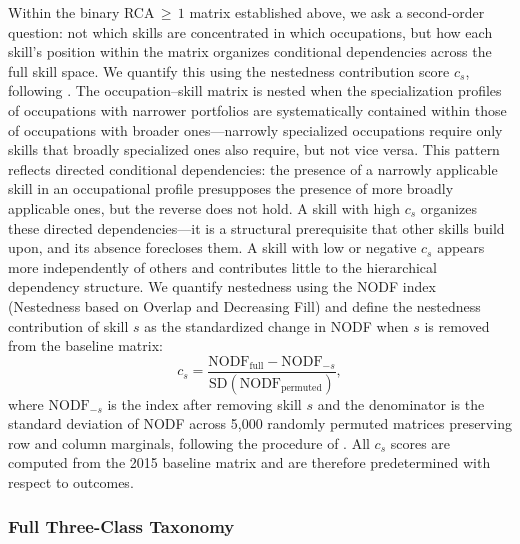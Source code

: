 \documentclass[11pt, letterpaper]{article} %
\newcommand{\parencite}[1]{\cite{#1}}
\newcommand{\textcite}[1]{\cite{#1}}
\begin{document}
Within the binary RCA$\,{\geq}\,1$ matrix established above, we ask a second-order question: not which skills are concentrated in which occupations, but how each skill's position within the matrix organizes conditional dependencies across the full skill space. We quantify this using the nestedness contribution score $c_s$, following \textcite{hosseinioun_skill_2025}. The occupation--skill matrix is nested when the specialization profiles of occupations with narrower portfolios are systematically contained within those of occupations with broader ones---narrowly specialized occupations require only skills that broadly specialized ones also require, but not vice versa. This pattern reflects directed conditional dependencies: the presence of a narrowly applicable skill in an occupational profile presupposes the presence of more broadly applicable ones, but the reverse does not hold. A skill with high $c_s$ organizes these directed dependencies---it is a structural prerequisite that other skills build upon, and its absence forecloses them. A skill with low or negative $c_s$ appears more independently of others and contributes little to the hierarchical dependency structure. We quantify nestedness using the NODF index (Nestedness based on Overlap and Decreasing Fill) \parencite{almeida_neto_consistent_2008} and define the nestedness contribution of skill $s$ as the standardized change in NODF when $s$ is removed from the baseline matrix:
%
\begin{equation*}
c_s = \frac{\mathrm{NODF}_{\text{full}} - \mathrm{NODF}_{-s}}{\mathrm{SD}(\mathrm{NODF}_{\text{permuted}})},
\end{equation*}
%
where $\mathrm{NODF}_{-s}$ is the index after removing skill $s$ and the denominator is the standard deviation of NODF across 5{,}000 randomly permuted matrices preserving row and column marginals, following the procedure of \textcite{hosseinioun_skill_2025}. All $c_s$ scores are computed from the 2015 baseline matrix and are therefore predetermined with respect to outcomes.
 
\subsubsection{Full Three-Class Taxonomy}
\label{sec:SI_taxonomy}
 
\end{document}
